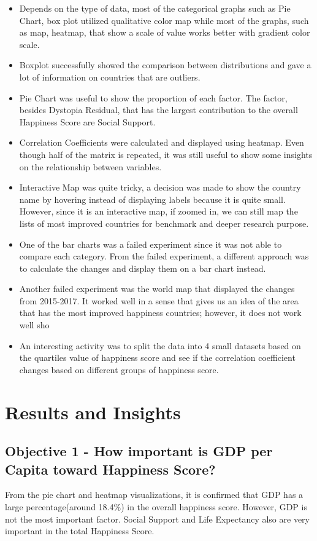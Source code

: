 \documentclass[11pt,twocolumn]{article}
\begin{document}
\begin{itemize}
\item Depends on the type of data, most of the categorical graphs such as Pie Chart, box plot utilized qualitative color map while most of the graphs, such as map, heatmap, that show a scale of value works better with gradient color scale. 
\item Boxplot successfully showed the comparison between distributions and gave a lot of information on countries that are outliers.
\item Pie Chart was useful to show the proportion of each factor. The factor, besides Dystopia Residual, that has the largest contribution to the overall Happiness Score are Social Support. 
\item Correlation Coefficients were calculated and displayed using heatmap. Even though half of the matrix is repeated, it was still useful to show some insights on the relationship between variables.
\item Interactive Map was quite tricky, a decision was made to show the country name by hovering instead of displaying labels because it is quite small. However, since it is an interactive map, if zoomed in, we can still map the lists of most improved countries for benchmark and deeper research purpose.
\item One of the bar charts was a failed experiment since it was not able to compare each category. From the failed experiment, a different approach was to calculate the changes and display them on a bar chart instead.
\item Another failed experiment was the world map that displayed the changes from 2015-2017. It worked well in a sense that gives us an idea of the area that has the most improved happiness countries; however, it does not work well sho

\item An interesting activity was to split the data into 4 small datasets based on the quartiles value of happiness score and see if the correlation coefficient changes based on different groups of happiness score. 
\end{itemize}
\section{Results and Insights}
\subsection{Objective 1 - How important is GDP per Capita toward Happiness Score?}
From the pie chart and heatmap visualizations, it is confirmed that GDP has a large percentage(around 18.4\%) in the overall happiness score. However, GDP is not the most important factor. Social Support and Life Expectancy also are very important in the total Happiness Score.
\end{document}
